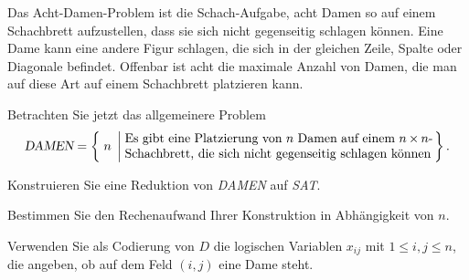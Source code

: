 Das Acht-Damen-Problem ist die Schach-Aufgabe, acht Damen so auf einem
Schachbrett aufzustellen, dass sie sich nicht gegenseitig schlagen können.
Eine Dame kann eine andere Figur schlagen, die sich in der gleichen Zeile,
Spalte oder Diagonale befindet.
Offenbar ist acht die maximale Anzahl von Damen, die man auf diese Art auf
einem Schachbrett platzieren kann.

Betrachten Sie jetzt das allgemeinere Problem
\[
\textsl{DAMEN}
=
\left\{\; n
\;\left|\;
\begin{minipage}{0.7\hsize}
Es gibt eine Platzierung von $n$ Damen auf einem $n\times n$-Schachbrett,
die sich nicht gegenseitig schlagen können
\end{minipage}\right.\right\}.
\]
\begin{teilaufgaben}
\item
Konstruieren Sie eine Reduktion von \textsl{DAMEN} auf \textsl{SAT}.
\item
Bestimmen Sie den Rechenaufwand Ihrer Konstruktion in Abhängigkeit von $n$.
\end{teilaufgaben}


\begin{hinweis}
Verwenden Sie als Codierung von $D$ die logischen Variablen $x_{ij}$
mit $1\le i,j\le n$, die angeben, ob auf dem Feld $(i,j)$ eine Dame
steht.
\end{hinweis}

